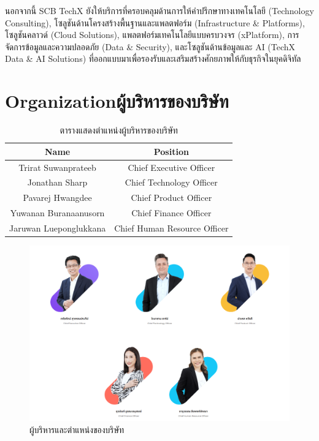 นอกจากนี้ SCB TechX ยังให้บริการที่ครอบคลุมด้านการให้คำปรึกษาทางเทคโนโลยี (Technology Consulting), โซลูชันด้านโครงสร้างพื้นฐานและแพลตฟอร์ม (Infrastructure \& Platforms), โซลูชันคลาวด์ (Cloud Solutions), แพลตฟอร์มเทคโนโลยีแบบครบวงจร (xPlatform), การจัดการข้อมูลและความปลอดภัย (Data \& Security), และโซลูชันด้านข้อมูลและ AI (TechX Data \& AI Solutions) ที่ออกแบบมาเพื่อรองรับและเสริมสร้างศักยภาพให้กับธุรกิจในยุคดิจิทัล

\clearpage

\section{\ifenglish Organization\else ผู้บริหารของบริษัท\fi}
\begin{table}[ht]
    \centering
    \begin{tabular}{|c|c|}
        \hline
        \textbf{Name}          & \textbf{Position}            \\
        \hline
        Trirat Suwanprateeb    & Chief Executive Officer      \\
        Jonathan Sharp         & Chief Technology Officer     \\
        Pavarej Hwangdee       & Chief Product Officer        \\
        Yuwanan Buranaanusorn  & Chief Finance Officer        \\
        Jaruwan Lueponglukkana & Chief Human Resource Officer \\
        \hline
    \end{tabular}
    \caption{ตารางแสดงตำแหน่งผู้บริหารของบริษัท}
\end{table}
\begin{figure}[ht]
    \begin{center}
        \includegraphics[scale=0.35]{images/org.png}
    \end{center}
    \caption[ผู้บริหารและตำแหน่งของบริษัท]{ผู้บริหารและตำแหน่งของบริษัท}
\end{figure}

